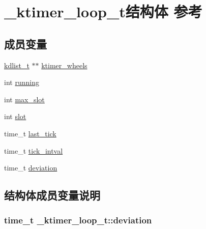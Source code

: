 \hypertarget{a00025}{}\section{\+\_\+ktimer\+\_\+loop\+\_\+t结构体 参考}
\label{a00025}
\subsection*{成员变量}
\begin{DoxyCompactItemize}
\item 
\hyperlink{a00066_ae098586334a621a23cef7cb17590b618_ae098586334a621a23cef7cb17590b618}{kdlist\+\_\+t} $\ast$$\ast$ \hyperlink{a00025_af46eedea07362213535dabc815b74c92_af46eedea07362213535dabc815b74c92}{ktimer\+\_\+wheels}
\item 
int \hyperlink{a00025_aab0b79491b93f3752c93dfb1d8c60e66_aab0b79491b93f3752c93dfb1d8c60e66}{running}
\item 
int \hyperlink{a00025_aeb8772fdff5de87ce1db9878f1357043_aeb8772fdff5de87ce1db9878f1357043}{max\+\_\+slot}
\item 
int \hyperlink{a00025_ae54f1df7a355b968dcc9baf7dca10a8d_ae54f1df7a355b968dcc9baf7dca10a8d}{slot}
\item 
time\+\_\+t \hyperlink{a00025_aa0cf5e5f3b5532aa4335d25831c9d2c3_aa0cf5e5f3b5532aa4335d25831c9d2c3}{last\+\_\+tick}
\item 
time\+\_\+t \hyperlink{a00025_a5bfbb75720e6a5310417980347763c82_a5bfbb75720e6a5310417980347763c82}{tick\+\_\+intval}
\item 
time\+\_\+t \hyperlink{a00025_a868b5369122bc5b595427a8c060249fc_a868b5369122bc5b595427a8c060249fc}{deviation}
\end{DoxyCompactItemize}


\subsection{结构体成员变量说明}
\hypertarget{a00025_a868b5369122bc5b595427a8c060249fc_a868b5369122bc5b595427a8c060249fc}{}
\subsubsection[{deviation}]{\setlength{\rightskip}{0pt plus 5cm}time\+\_\+t \+\_\+ktimer\+\_\+loop\+\_\+t\+::deviation}\label{a00025_a868b5369122bc5b595427a8c060249fc_a868b5369122bc5b595427a8c060249fc}
\hypertarget{a00025_af46eedea07362213535dabc815b74c92_af46eedea07362213535dabc815b74c92}{}
